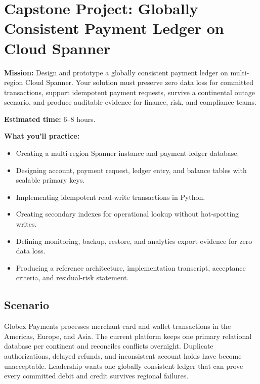 \section{Capstone Project: Globally Consistent Payment Ledger on Cloud Spanner}\label{sec:ch3-capstone}

\begin{capstonebox}
\textbf{Mission:} Design and prototype a globally consistent payment ledger on multi-region Cloud Spanner. Your solution must preserve zero data loss for committed transactions, support idempotent payment requests, survive a continental outage scenario, and produce auditable evidence for finance, risk, and compliance teams.

\textbf{Estimated time:} 6--8 hours.

\textbf{What you'll practice:}
\begin{itemize}
    \item Creating a multi-region Spanner instance and payment-ledger database.
    \item Designing account, payment request, ledger entry, and balance tables with scalable primary keys.
    \item Implementing idempotent read-write transactions in Python.
    \item Creating secondary indexes for operational lookup without hot-spotting writes.
    \item Defining monitoring, backup, restore, and analytics export evidence for zero data loss.
    \item Producing a reference architecture, implementation transcript, acceptance criteria, and residual-risk statement.
\end{itemize}
\end{capstonebox}

\subsection*{Scenario}
Globex Payments processes merchant card and wallet transactions in the Americas, Europe, and Asia. The current platform keeps one primary relational database per continent and reconciles conflicts overnight. Duplicate authorizations, delayed refunds, and inconsistent account holds have become unacceptable. Leadership wants one globally consistent ledger that can prove every committed debit and credit survives regional failures.


